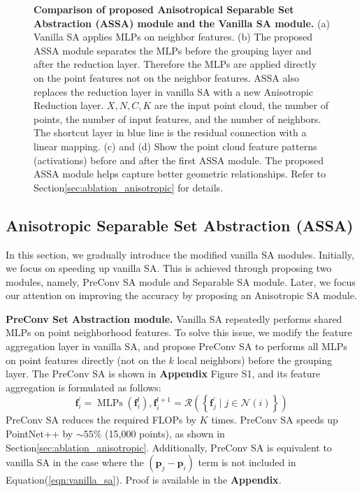 \documentclass{article}
\newcommand{\eqnLabel}{Equation\xspace}
\newcommand{\eqnref}[1]{(\ref{#1})}
\newcommand{\secLabel}{Section\xspace}
\newcommand{\mysection}[1]{\vspace{3pt}\noindent\textbf{#1.}}
\newcommand{\supp}{\textbf{Appendix}\xspace}
\begin{document}
\begin{figure}[!ht]
\begin{minipage}[t][0mm][t]{.49\textwidth}
\end{minipage}
\caption{
\textbf{Comparison of proposed Anisotropical Separable Set Abstraction (ASSA) module and the Vanilla SA module.} (a) Vanilla SA \cite{Qi2017PointNetDH} applies MLPs on neighbor features. (b) The proposed ASSA module separates the MLPs before the grouping layer and after the reduction layer. Therefore the MLPs are applied directly on the point features not on the neighbor features. ASSA also replaces the reduction layer in vanilla SA with a new Anisotropic Reduction layer. 
$X, N, C, K$ are the input point cloud, the number of points, the number of input features, and the number of neighbors. The shortcut layer in blue line is the residual connection with a linear mapping. 
(c) and (d) Show the point cloud feature patterns (activations) before and after the first ASSA module. The proposed ASSA module helps capture better geometric relationships. Refer to \secLabel \ref{sec:ablation_anisotropic} for details. 
}
\label{fig:sa_module}
\end{figure}



\subsection{Anisotropic Separable Set Abstraction (ASSA)}\label{sec:assa}
In this section, we gradually introduce the modified vanilla SA modules. Initially, we focus on speeding up vanilla SA. This is achieved through proposing two modules, namely, PreConv SA module and Separable SA module. Later, we focus our attention on improving the accuracy by proposing an Anisotropic SA module. 

\mysection{PreConv Set Abstraction module}
Vanilla SA repeatedly performs shared MLPs on point neighborhood features. To solve this issue, we modify the feature aggregation layer in vanilla SA, and propose PreConv SA to performs all MLPs on point features directly (not on the $k$ local neighbors) before the grouping layer. The PreConv SA is shown in \supp Figure  S1, and its  feature aggregation is formulated as follows:
\begin{equation}
\mathbf{f}_{i}^{\prime}=\operatorname{MLPs}\left(\mathbf{f}_{i}^{l}\right), \mathbf{f}_{i}^{l+1}=\mathcal{R}\left(\left\{\mathbf{f}_{j}^{\prime} \mid j \in \mathcal{N}(i)\right\}\right)
\end{equation}
PreConv SA reduces the required FLOPs by $K$ times. PreConv SA speeds up PointNet++ by $\sim 55\%$ (15,000 points), as shown in \secLabel \ref{sec:ablation_anisotropic}. Additionally, PreConv SA is equivalent to vanilla SA in the case where the $(\mathbf{p}_j - \mathbf{p}_i)$ term is not included in \eqnLabel \eqnref{eqn:vanilla_sa}. Proof is available in the \supp.
\end{document}
